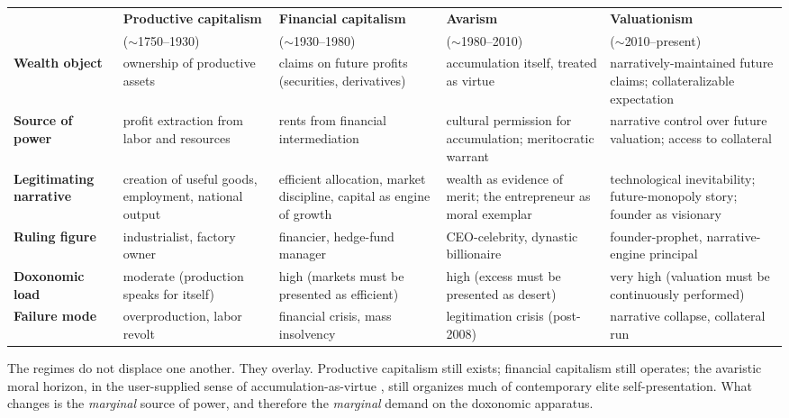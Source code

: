 \begin{center}
\footnotesize
\begin{tabular}{p{2.1cm}p{2.4cm}p{2.4cm}p{2.4cm}p{2.4cm}}
\toprule
 & \textbf{Productive capitalism} & \textbf{Financial capitalism} & \textbf{Avarism} & \textbf{Valuationism} \\
 & ($\sim$1750--1930) & ($\sim$1930--1980) & ($\sim$1980--2010) & ($\sim$2010--present) \\
\midrule
\textbf{Wealth object} & ownership of productive assets & claims on future profits (securities, derivatives) & accumulation itself, treated as virtue & narratively-maintained future claims; collateralizable expectation \\[6pt]
\textbf{Source of power} & profit extraction from labor and resources & rents from financial intermediation & cultural permission for accumulation; meritocratic warrant & narrative control over future valuation; access to collateral \\[6pt]
\textbf{Legitimating narrative} & creation of useful goods, employment, national output & efficient allocation, market discipline, capital as engine of growth & wealth as evidence of merit; the entrepreneur as moral exemplar & technological inevitability; future-monopoly story; founder as visionary \\[6pt]
\textbf{Ruling figure} & industrialist, factory owner & financier, hedge-fund manager & CEO-celebrity, dynastic billionaire & founder-prophet, narrative-engine principal \\[6pt]
\textbf{Doxonomic load} & moderate (production speaks for itself) & high (markets must be presented as efficient) & high (excess must be presented as desert) & very high (valuation must be continuously performed) \\[6pt]
\textbf{Failure mode} & overproduction, labor revolt & financial crisis, mass insolvency & legitimation crisis (post-2008) & narrative collapse, collateral run \\
\bottomrule
\end{tabular}
\end{center}

The regimes do not displace one another. They overlay. Productive capitalism still exists; financial capitalism still operates; the avaristic moral horizon, in the user-supplied sense of accumulation-as-virtue \autocite{sandel2012, veblen1899}, still organizes much of contemporary elite self-presentation. What changes is the \emph{marginal} source of power, and therefore the \emph{marginal} demand on the doxonomic apparatus.

